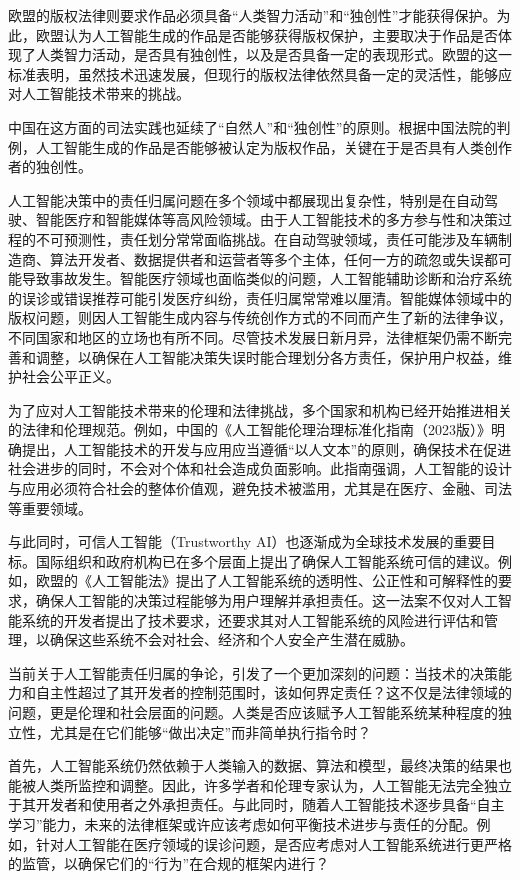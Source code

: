 欧盟的版权法律则要求作品必须具备“人类智力活动”和“独创性”才能获得保护。为此，欧盟认为人工智能生成的作品是否能够获得版权保护，主要取决于作品是否体现了人类智力活动，是否具有独创性，以及是否具备一定的表现形式。欧盟的这一标准表明，虽然技术迅速发展，但现行的版权法律依然具备一定的灵活性，能够应对人工智能技术带来的挑战。

中国在这方面的司法实践也延续了“自然人”和“独创性”的原则。根据中国法院的判例，人工智能生成的作品是否能够被认定为版权作品，关键在于是否具有人类创作者的独创性。

人工智能决策中的责任归属问题在多个领域中都展现出复杂性，特别是在自动驾驶、智能医疗和智能媒体等高风险领域。由于人工智能技术的多方参与性和决策过程的不可预测性，责任划分常常面临挑战。在自动驾驶领域，责任可能涉及车辆制造商、算法开发者、数据提供者和运营者等多个主体，任何一方的疏忽或失误都可能导致事故发生。智能医疗领域也面临类似的问题，人工智能辅助诊断和治疗系统的误诊或错误推荐可能引发医疗纠纷，责任归属常常难以厘清。智能媒体领域中的版权问题，则因人工智能生成内容与传统创作方式的不同而产生了新的法律争议，不同国家和地区的立场也有所不同。尽管技术发展日新月异，法律框架仍需不断完善和调整，以确保在人工智能决策失误时能合理划分各方责任，保护用户权益，维护社会公平正义。

为了应对人工智能技术带来的伦理和法律挑战，多个国家和机构已经开始推进相关的法律和伦理规范。例如，中国的《人工智能伦理治理标准化指南（2023版）》明确提出，人工智能技术的开发与应用应当遵循“以人文本”的原则，确保技术在促进社会进步的同时，不会对个体和社会造成负面影响。此指南强调，人工智能的设计与应用必须符合社会的整体价值观，避免技术被滥用，尤其是在医疗、金融、司法等重要领域。

与此同时，可信人工智能（Trustworthy AI）也逐渐成为全球技术发展的重要目标。国际组织和政府机构已在多个层面上提出了确保人工智能系统可信的建议。例如，欧盟的《人工智能法》提出了人工智能系统的透明性、公正性和可解释性的要求，确保人工智能的决策过程能够为用户理解并承担责任。这一法案不仅对人工智能系统的开发者提出了技术要求，还要求其对人工智能系统的风险进行评估和管理，以确保这些系统不会对社会、经济和个人安全产生潜在威胁。

当前关于人工智能责任归属的争论，引发了一个更加深刻的问题：当技术的决策能力和自主性超过了其开发者的控制范围时，该如何界定责任？这不仅是法律领域的问题，更是伦理和社会层面的问题。人类是否应该赋予人工智能系统某种程度的独立性，尤其是在它们能够“做出决定”而非简单执行指令时？

首先，人工智能系统仍然依赖于人类输入的数据、算法和模型，最终决策的结果也能被人类所监控和调整。因此，许多学者和伦理专家认为，人工智能无法完全独立于其开发者和使用者之外承担责任。与此同时，随着人工智能技术逐步具备“自主学习”能力，未来的法律框架或许应该考虑如何平衡技术进步与责任的分配。例如，针对人工智能在医疗领域的误诊问题，是否应考虑对人工智能系统进行更严格的监管，以确保它们的“行为”在合规的框架内进行？

